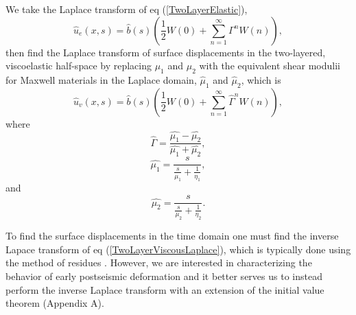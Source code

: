 \documentclass[fleqn,12pt]{article}
\begin{document}
We take the Laplace transform of eq (\ref{TwoLayerElastic}),
\begin{equation}\label{TwoLayerElasticLaplace}
 \hat{u}_e(x,s) = \hat{b}(s)\left(\frac{1}{2} W(0) +\sum_{n=1}^\infty\Gamma^nW(n)\right),
\end{equation}
then find the Laplace transform of surface displacements in the
two-layered, viscoelastic half-space by replacing $\mu_1$ and $\mu_2$
with the equivalent shear modulii for Maxwell materials in the Laplace
domain, $\hat{\mu}_1$ and $\hat{\mu}_2$, which is
\begin{equation}\label{TwoLayerViscousLaplace}
 \hat{u}_v(x,s) = \hat{b}(s)\left(\frac{1}{2}W(0) +\sum_{n=1}^\infty\hat{\Gamma}^nW(n)\right),
\end{equation}
where
\begin{equation}
  \hat{\Gamma} = \frac{\hat{\mu_1} - \hat{\mu_2}}{\hat{\mu_1} + \hat{\mu_2}},
\end{equation}
\begin{equation}
  \hat{\mu_1} = \frac{s}{\frac{s}{\mu_1} + \frac{1}{\eta_1}} ,
\end{equation}
and
\begin{equation}
  \hat{\mu_2} = \frac{s}{\frac{s}{\mu_2} + \frac{1}{\eta_2}}.
\end{equation}

To find the surface displacements in the time domain one must find the
inverse Lapace transform of eq (\ref{TwoLayerViscousLaplace}), which
is typically done using the method of residues
\citep[e.g.][]{NM1974}. However, we are interested in characterizing
the behavior of early postseismic deformation and it better serves
us to instead perform the inverse Laplace transform with an extension
of the initial value theorem (Appendix A).
\end{document}
